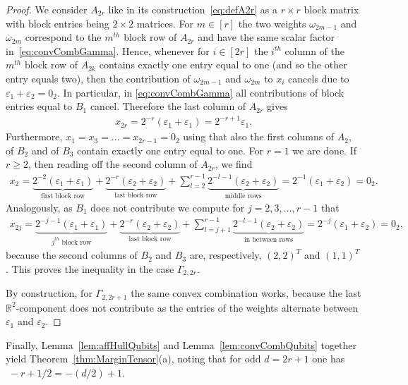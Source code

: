 \documentclass[10pt,a4paper]{article}
\numberwithin{equation}{section}
\newcommand{\RR}{\mathbb R}
\newcommand{\eps}{\varepsilon}
\begin{document}
\begin{proof}
We consider $A_{2r}$ like in its construction~\eqref{eq:defA2r} as a $r \times r$ block matrix with block entries being $2 \times 2$ matrices. For $m \in [r]$ the two weights $\omega_{2m-1}$ and $\omega_{2m}$ correspond to the $m^{th}$ block row of $A_{2r}$ and have the same scalar factor in~\eqref{eq:convCombGamma}. Hence, whenever for $i \in [2r]$ the $i^{th}$ column of the $m^{th}$ block row of $A_{2k}$ contains exactly one entry equal to one (and so the other entry equals two), then the contribution of $\omega_{2m-1}$ and $\omega_{2m}$ to $x_i$ cancels due to $\eps_1 + \eps_2 = 0_2$.
In particular, in \eqref{eq:convCombGamma} all contributions of block entries equal to $B_1$ cancel. Therefore the last column of $A_{2r}$ gives
	\begin{align*}
	x_{2r} = 2^{-r} (\eps_1 + \eps_1) = 2^{-r+1} \eps_1.
	\end{align*}
Furthermore, $x_1 = x_{3} = \ldots = x_{2r-1} = 0_2$ using that also the first columns of $A_2$, of $B_2$ and of $B_3$ contain exactly one entry equal to one. For $r=1$ we are done.
If $r \geq 2$, then reading off the second column of $A_{2r}$, we find 
	\begin{align*}
	x_2 = \underbrace{2^{-2} (\eps_1 + \eps_1)}_{\text{first block row}} + \underbrace{2^{-r} (\eps_2 + \eps_2)}_{\text{last block row}} + \sum_{l=2}^{r-1} \underbrace{ 2^{-l-1} (\eps_2 + \eps_2)}_{\text{middle rows}} = 2^{-1} (\eps_1 + \eps_2) = 0_2.
	\end{align*}
Analogously, as $B_1$ does not contribute we compute for $j = 2,3,\ldots,r-1$ that
	\begin{align*}
	x_{2j} = \underbrace{2^{-j-1} (\eps_1 + \eps_1)}_{j^{th} \text{ block row}} + \underbrace{2^{-r} (\eps_2 + \eps_2)}_{\text{last block row}} + \sum_{l=j+1}^{r-1} \underbrace{ 2^{-l-1} (\eps_2 + \eps_2)}_{\text{in between rows}} = 2^{-j} (\eps_1 + \eps_2) = 0_2,
	\end{align*}
because the second columns of $B_2$ and $B_3$ are, respectively, $(2,2)^T$ and $(1,1)^T$. This proves the inequality in the case $\Gamma_{2,2r}$.

By construction, for $\Gamma_{2,2r+1}$ the same convex combination works, because the last $\RR^2$-component does not contribute as the entries of the weights alternate between $\eps_1$ and $\eps_2$.
\end{proof}

Finally, Lemma~\ref{lem:affHullQubits} and Lemma~\ref{lem:convCombQubits} together yield Theorem~\ref{thm:MarginTensor}(a), noting that for odd $d=2r+1$ one has $\; -r + 1/2 = -(d/2) + 1$.
\end{document}
